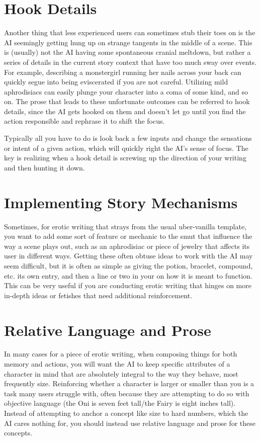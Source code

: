 ﻿\documentclass[Coomer-main.tex]{subfiles}
\begin{document}
\section{Hook Details}

Another thing that less experienced users can sometimes stub their toes on is the AI seemingly getting hung up on strange tangents in the middle of a scene.
This is (usually) not the AI having some spontaneous cranial meltdown, but rather a series of details in the current story context that have too much sway over events.
For example, describing a monstergirl running her nails across your back can quickly segue into being eviscerated if you are not careful.
Utilizing mild aphrodisiacs can easily plunge your character into a coma of some kind, and so on.
The prose that leads to these unfortunate outcomes can be referred to hook details, since the AI gets hooked on them and doesn't let go until you find the action responsible and rephrase it to shift the focus.

Typically all you have to do is look back a few inputs and change the sensations or intent of a given action, which will quickly right the AI's sense of focus.
The key is realizing when a hook detail is screwing up the direction of your writing and then hunting it down.

\section{Implementing Story Mechanisms}

Sometimes, for erotic writing that strays from the usual uber-vanilla template, you want to add some sort of feature or mechanic to the smut that influence the way a scene plays out, such as an aphrodisiac or piece of jewelry that affects its user in different ways.
Getting these often obtuse ideas to work with the AI may seem difficult, but it is often as simple as giving the potion, bracelet, compound, etc.
its own \wi entry, and then a line or two in your \rem on how it is meant to function.
This can be very useful if you are conducting erotic writing that hinges on more in-depth ideas or fetishes that need additional reinforcement.

\section{Relative Language and Prose}

In many cases for a piece of erotic writing, when composing things for both memory and actions, you will want the AI to keep specific attributes of a character in mind that are absolutely integral to the way they behave, most frequently size.
Reinforcing whether a character is larger or smaller than you is a task many users struggle with, often because they are attempting to do so with objective language (the Oni is seven feet tall/the Fairy is eight inches tall).
Instead of attempting to anchor a concept like size to hard numbers, which the AI cares nothing for, you should instead use relative language and prose for these concepts.
\end{document}
